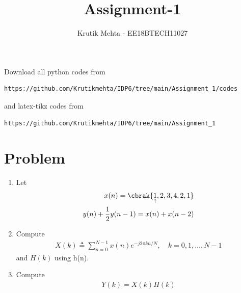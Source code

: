 \documentclass[journal,12pt,twocolumn]{IEEEtran}
\renewcommand\thesection{\arabic{section}}
\begin{document}
     \def\rightbox#1{\makebox[0in][r]{#1}}
     \def\centbox#1{\makebox[0in]{#1}}
     \def\topbox#1{\raisebox{-\baselineskip}[0in][0in]{#1}}
     \def\midbox#1{\raisebox{-0.5\baselineskip}[0in][0in]{#1}}
\vspace{3cm}
\title{Assignment-1}
\author{Krutik Mehta - EE18BTECH11027}
\maketitle
\newpage
\bigskip
\renewcommand{\thefigure}{\theenumi}
\renewcommand{\thetable}{\theenumi}
Download all python codes from 
\begin{lstlisting}
https://github.com/Krutikmehta/IDP6/tree/main/Assignment_1/codes\end{lstlisting}
%
and latex-tikz codes from 
%
\begin{lstlisting}
https://github.com/Krutikmehta/IDP6/tree/main/Assignment_1
\end{lstlisting}

\section{Problem}
\begin{enumerate}[label=\thesection.\arabic*.,ref=\thesection.\theenumi]
    
    \item Let
    \begin{align}
        x(n) = \cbrak{\underset{\uparrow}{1},2,3,4,2,1}
         \label{eq:equation0}\\
        y(n) + \frac{1}{2}y(n-1) = x(n) + x(n-2)	
        \label{eq:equation1}
    \end{align}
    
    \item Compute 
    \begin{align}
        X(k) \triangleq \sum_{n=0}^{N-1} x(n) e^{-j 2 \pi k n / N}, \quad k=0,1, \ldots, N-1
    \end{align}
    and $H(k)$ using h(n).
    
    \item Compute 
    \begin{align}
    Y(k) = X(k)H(k)
    \end{align}
\end{enumerate}
\end{document}
